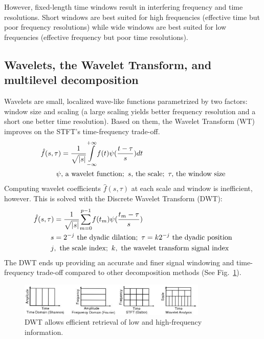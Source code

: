 \documentclass[runningheads]{llncs}
\begin{document}
However, fixed-length time windows result in interfering frequency and time resolutions. Short windows are best suited for high frequencies (effective time but poor frequency resolutions) while wide windows are best suited for low frequencies (effective frequency but poor time resolutions).

\subsection{Wavelets, the Wavelet Transform, and multilevel decomposition}

Wavelets are small, localized wave-like functions\cite{andrew_nicoll} parametrized by two factors: window size and scaling (a large scaling yields better frequency resolution and a short one better time resolution). Based on them, the Wavelet Transform (WT) improves on the STFT's time-frequency trade-off.
\begin{align}
    \hat{f}(s, \tau)&=\frac{1}{\sqrt{|s|}}\underset{-\infty}{\overset{+\infty}{\int}}f(t)\psi(\frac{t-\tau}{s})dt\\
    \psi&,\,\text{a wavelet function};\,\,s,\,\text{the scale};\,\,\tau,\,\text{the window size}\notag
\end{align}
Computing wavelet coefficients $\hat{f}(s,\tau)$ at each scale and window is inefficient, however. This is solved with the Discrete Wavelet Transform (DWT):
\begin{align}
    \hat{f}(s, \tau)&=\frac{1}{\sqrt{|s|}}\underset{m=0}{\overset{p-1}{\sum}}f(t_m)\psi(\frac{t_m-\tau}{s})\\
    s&=2^{-j}\,\,\text{the dyadic dilation}\notag;\,\,\tau=k2^{-j}\,\,\text{the dyadic position}\notag\\
    j&,\,\,\text{the scale index};\,\,k,\,\,\text{the wavelet transform signal index}\notag
\end{align}
The DWT ends up providing an accurate and finer signal windowing and time-frequency trade-off compared to other decomposition methods (See Fig.~\ref{fig1}).
\begin{figure}
\centering\includegraphics[width=0.8\textwidth]{dwt.png}
\caption{DWT allows efficient retrieval of low and high-frequency information\cite{dwt}.} \label{fig1}
\end{figure}
\end{document}
